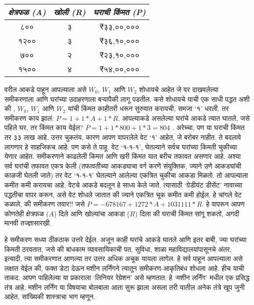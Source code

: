 \begin{table}[h!]
\centering
\begin{tabular}{|c|c|c|}
\hline
\textit{क्षेत्रफळ (A)} & \textit{खोली (R)} & \textit{घराची किंमत (P)} \\
\hline
८०० & ३ & ₹३३,००,००० \\
१२०० & ३ & ₹३६,१०,००० \\
७०० & २ & ₹२३,१०,००० \\
१५०० & ४ & ₹५४,००,००० \\
\hline
\end{tabular}
\end{table}


वरील आकडे पाहून आपल्याला असे $W_0$, $W_1$ आणि $W_2$ शोधायचे आहेत जे वर दाखवलेल्या समीकरणाला आणि घरांच्या उदाहरणाला बऱ्यापैकी लागू पडतील. कसे शोधायचे याची एक साधी पद्धत अशी की , $W_0$, $W_1$ आणि $W_2$ यांची किंमत काहीतरी धरून सुरुवात करायची, समजा `१' धरली. तर समीकरण काय झालं: $P = 1+ 1 *A + 1 *R$. आपल्याकडे असलेल्या घरांचे आकडे त्यात घातले, जसे पहिले घर, तर किंमत काय येईल? $P = 1+ 1 * 800 + 1*3 = 804$ . अरेच्चा, पण या घराची किंमत तर ३३ लाख आहे. उत्तर चुकतंय, कारण आपण वापरलेले वेट `१' आहेत, जे बरोबर नाहीत. ते बदलावे लागणार हे साहजिकच आहे. पण कसे ते पाहू. वेट `१-१-१', घेतल्याने सर्वच घरांच्या किमती चुकीच्या येणार आहेत. समीकरणाने काढलेली किमत आणि खरी किंमत यात बरीच तफावत असणार आहे. अश्या सर्व घरांची तफावत एकत्र केली (तफावतीच्या आकड्याचा वर्ग करणे संयुक्तिक, ज्याने उणे आकड्यांची काळजी घेतली जाते) तर वेट `१-१-१' घेतल्याने आलेल्या एकत्रित चुकीचा आकडा मिळतो. तो आपल्याला कमीत कमी करायचा आहे. वेटचे आकडे बदलून हे साध्य केले जाते. त्यासाठी `ग्रेडीयंट डीसेंट' नावाच्या पद्धतीचा वापर करून, असे वेट शोधले जातात की ज्याने एकत्रित चूक कमीत कमी होईल. हे चांगले वेट कळाले, की समीकरण तयार!! जसे $P = -678167 + 1272 * A + 1031111 * R$. हे वापरून आपण कोणतेही क्षेत्रफळ ($A$) दिले आणि खोल्यांचा आकडा ($R$) दिला की  घराची किंमत सांगू शकतो, अगदी मानवी तज्ज्ञासारखी.

हे समीकरण सध्या ठीकठाक उत्तरे देईल. अजून काही घरांचे आकडे  घातले  आणि इतर बाबी, ज्या घरांच्या किमती ठरवतात, जसे की बांधकाम व्यावसायिकाची पत, सुविधा, शाळा महाविद्यालयांपासूनचे अंतर, इत्यादी, त्या समीकरणात आणल्या तर उत्तर अधिक अचूक यायला लागेल. हे सर्व पाहून आपल्याला असे लक्षात येईल की, फक्त डेटा देऊन मशीन लर्निंगने त्यातून समीकरण-आकृतिबंध शोधला आहे. हीच याची ताकद. आपण पाहिलेल्या या प्रकाराला `लिनियर रेग्रेशन' असे म्हणतात. हे `मशीन लर्निंग' मधील एक प्रसिद्ध तंत्र आहे. मशीन लर्निंग या विषयाचा बोलबाला आता सुरू झाला असला तरी यातील अनेक तंत्रे खूप जुनी आहेत, सांख्यिकी शास्त्राचा भाग म्हणून.

